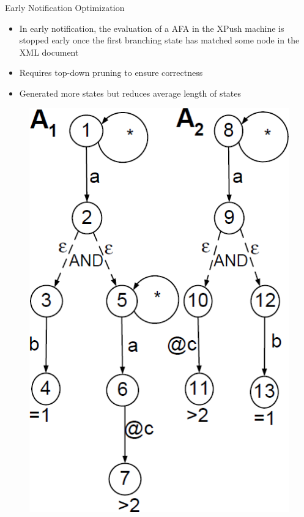 \documentclass[mathserif,serif]{beamer}
\begin{document}
\begin{frame}{Early Notification Optimization}
  \begin{minipage}{0.63\textwidth}
  \begin{itemize}
    \item In early notification, the evaluation of a AFA in the XPush machine is stopped early once the first branching state has matched some node in the XML document
    \item Requires top-down pruning to ensure correctness
    \item Generated more states but reduces average length of states
  \end{itemize}
  \end{minipage}\quad
  \begin{minipage}{0.3\textwidth}
    \begin{figure}
      \centering
      \includegraphics[width=\textwidth]{AFA.png}
    \end{figure}
  \end{minipage}

\end{frame}
\end{document}
